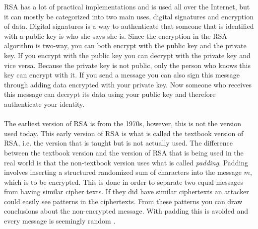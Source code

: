 \documentclass[frame, english]{idamasterthesis}
\begin{document}
\noindent
RSA has a lot of practical implementations and is used all over the Internet, but it can mostly be categorized into two main uses, digital signatures and encryption of data. Digital signatures is a way to authenticate that someone that is identified with a public key is who she says she is. Since the encryption in the RSA-algorithm is two-way, you can both encrypt with the public key and the private key. If you encrypt with the public key you can decrypt with the private key and vice versa. Because the private key is not public, only the person who knows this key can encrypt with it. If you send a message you can also sign this message through adding data encrypted with your private key. Now someone who receives this message can decrypt its data using your public key and therefore authenticate your identity. \\\\
The earliest version of RSA is from the 1970s, however, this is not the version used today. This early version of RSA is what is called the textbook version of RSA, i.e. the version that is taught but is not actually used. The difference between the textbook version and the version of RSA that is being used in the real world is that the non-textbook version uses what is called \emph{padding}. Padding involves inserting a structured randomized sum of characters into the message $m$, which is to be encrypted. This is done in order to separate two equal messages from having similar cipher texts. If they did have similar ciphertexts an attacker could easily see patterns in the ciphertexts. From these patterns you can draw conclusions about the non-encrypted message. With padding this is avoided and every message is seemingly random \cite{handcrypt}.

\pagebreak
\end{document}
